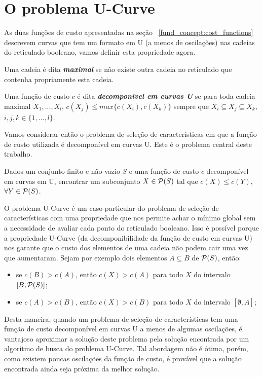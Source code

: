 \section{O problema U-Curve}
As duas funções de custo apresentadas na seção ~\ref{fund_concept:cost_functions}
descrevem curvas que tem um formato em U (a menos de oscilações) nas 
cadeias do reticulado booleano, vamos definir esta propriedade agora.

\begin{mydefinition}
Uma cadeia é dita {\bf \em maximal} se não existe outra cadeia no 
reticulado que contenha propriamente esta cadeia.
\end{mydefinition}

\begin{mydefinition}\label{fund_concepts:ushape}
Uma função de custo $c$ é dita {\bf \em decomponível em curvas U} se
para toda cadeia maximal $X_1, ..., X_l$, $c(X_j) \leq max \{c (X_i),
c (X_k)\}$ sempre que $X_i \subseteq X_j \subseteq X_k$, $i, j, k \in 
\{1, ..., l\}$.
\end{mydefinition}

Vamos considerar então o problema de seleção de características em que a
função de custo utilizada é decomponível em curvas U. Este é o problema 
central deste trabalho.

\begin{mydefinition}
Dados um conjunto finito e não-vazio $S$ e uma função de custo $c$ 
decomponível em curvas em U, encontrar um subconjunto $X \in 
\mathcal{P} (S)$ tal que $c(X) \leq c(Y)$,  $\forall Y \in \mathcal{P} (S)$.
\end{mydefinition}

O problema U-Curve é um caso particular do problema de seleção de 
características com uma propriedade que nos permite achar o mínimo
global sem a necessidade de avaliar cada ponto do reticulado booleano. 
Isso é possível porque a propriedade U-Curve (da decomponibilidade da 
função de custo em curvas U) nos garante que o custo dos elementos de 
uma cadeia não podem cair uma vez que aumentaram. Sejam por exemplo
dois elementos $A \subseteq B$ de $\mathcal{P} (S)$, então:
\begin{itemize}
    \item{se $c(B) > c (A)$, então $c (X) > c (A)$ para todo $X$
        do intervalo $[B, \mathcal{P} (S)]$;}
    \item{se $c(A) > c (B)$, então $c (X) > c (B)$ para todo $X$ 
        do intervalo $[\emptyset, A]$;}
\end{itemize}

Desta maneira, quando um problema de seleção de características tem uma 
função de custo decomponível em curvas U a menos de algumas oscilações,
é vantajoso aproximar a solução deste problema pela solução encontrada
por um algoritmo de busca do problema U-Curve. Tal abordagem não é 
ótima, porém, como existem poucas oscilações da função de custo, é 
provável que a solução encontrada ainda seja próxima da melhor solução.


